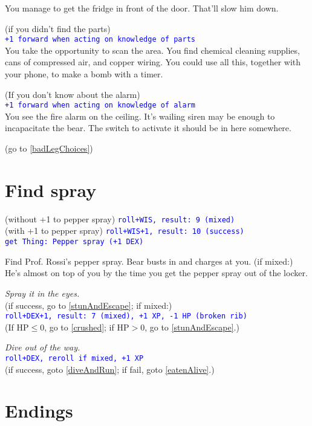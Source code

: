 \documentclass[12pt]{article}
\begin{document}
You manage to get the fridge in front of the door. That'll slow him down.

(if you didn't find the parts)\\
\textcolor{blue}{\texttt{+1 forward when acting on knowledge of parts}}\\
You take the opportunity to scan the area. You find chemical cleaning supplies, cans of compressed air, and copper wiring. You could use all this, together with your phone, to make a bomb with a timer.

(If you don't know about the alarm)\\
\textcolor{blue}{\texttt{+1 forward when acting on knowledge of alarm}}\\
You see the fire alarm on the ceiling. It's wailing siren may be enough to incapacitate the bear. The switch to activate it should be in here somewhere.

(go to \ref{badLegChoices})

\section{Find spray}\label{findSpray}

(without +1 to pepper spray) \texttt{\textcolor{blue}{roll+WIS, result:~9 (mixed)}}\\
(with +1 to pepper spray) \texttt{\textcolor{blue}{roll+WIS+1, result:~10 (success)}}\\
\textcolor{blue}{\texttt{get Thing:~Pepper spray (+1 DEX)}}

Find Prof. Rossi's pepper spray. Bear busts in and charges at you. (if mixed:) He's almost on top of you by the time you get the pepper spray out of the locker.

\textit{Spray it in the eyes.}\\
(if success, go to \ref{stunAndEscape}; if mixed:)\\
\texttt{\textcolor{blue}{roll+DEX+1, result:~7 (mixed), +1 XP, -1 HP (broken rib)}}\\
(If $\text{HP} \le 0$, go to \ref{crushed}; if $\text{HP} > 0$, go to \ref{stunAndEscape}.)

\textit{Dive out of the way.}\\
\textcolor[rgb]{0,0,0}{\texttt{\textcolor{blue}{roll+DEX, reroll if mixed, +1 XP}}}\\
(if success, goto \ref{diveAndRun}; if fail, goto \ref{eatenAlive}.)

\section{Endings}
\end{document}
